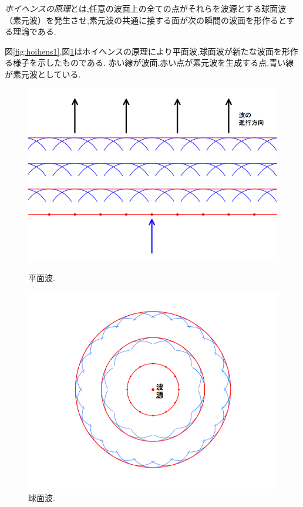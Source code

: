 \emph{ホイヘンスの原理}とは,任意の波面上の全ての点がそれらを波源とする球面波（素元波）を発生させ,素元波の共通に接する面が次の瞬間の波面を形作るとする理論である.

図\ref{fig:hoihens1},図\ref{fig:hoihens2}はホイヘンスの原理により平面波,球面波が新たな波面を形作る様子を示したものである. 赤い線が波面,赤い点が素元波を生成する点,青い線が素元波としている.

\begin{figure}[thbp]
\begin{minipage}{0.5\hsize}
\begin{center}
\includegraphics[width=\linewidth]
  {../background/hoihens1.png}
\caption{平面波.}
\label{fig:hoihens1}
\end{center}
\end{minipage}%
\begin{minipage}{0.5\hsize}
\begin{center}
\includegraphics[width=\linewidth]
  {../background/hoihens2.png}
\caption{球面波.}
\label{fig:hoihens2}
\end{center}
\end{minipage}
\end{figure}
\newpage



